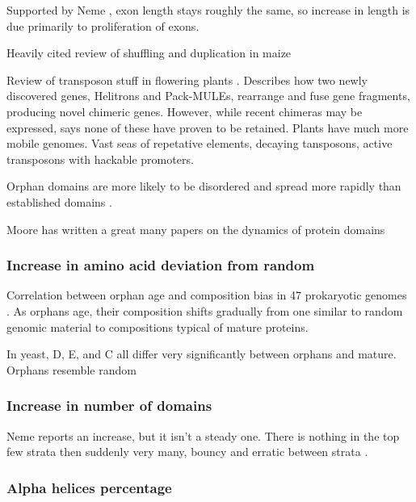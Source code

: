         Supported by Neme \cite{neme_phylogenetic_2013}, exon length stays
        roughly the same, so increase in length is due primarily to
        proliferation of exons.

        Heavily cited review of shuffling and duplication in maize
        \cite{morgante_gene_2005}

        Review of transposon stuff in flowering plants
        \cite{bennetzen_transposable_2005}. Describes how two newly discovered
        genes, Helitrons and Pack-MULEs, rearrange and fuse gene fragments,
        producing novel chimeric genes. However, while recent chimeras may be
        expressed, says none of these have proven to be retained. Plants have much
        more mobile genomes. Vast seas of repetative elements, decaying tansposons,
        active transposons with hackable promoters.

        Orphan domains are more likely to be disordered and spread more rapidly
        than established domains \cite{moore_dynamics_2011}.

        Moore has written a great many papers on the dynamics of protein
        domains \cite{moore_arrangements_2008, moore_dynamics_2011,
        moore_quantification_2013}

    \subsubsection{Increase in amino acid deviation from random}

        Correlation between orphan age and composition bias in 47
        prokaryotic genomes \cite{yomtovian_composition_2010}. As orphans
        age, their composition shifts gradually from one similar to random
        genomic material to compositions typical of mature proteins.

        In yeast, D, E, and C all differ very significantly between orphans
        and mature. Orphans resemble random
        \cite{carvunis_proto-genes_2012}

    \subsubsection{Increase in number of domains}

        Neme reports an increase, but it isn't a steady one. There is
        nothing in the top few strata then suddenly very many, bouncy and
        erratic between strata \cite{neme_phylogenetic_2013}.

    \subsubsection{Alpha helices percentage}

